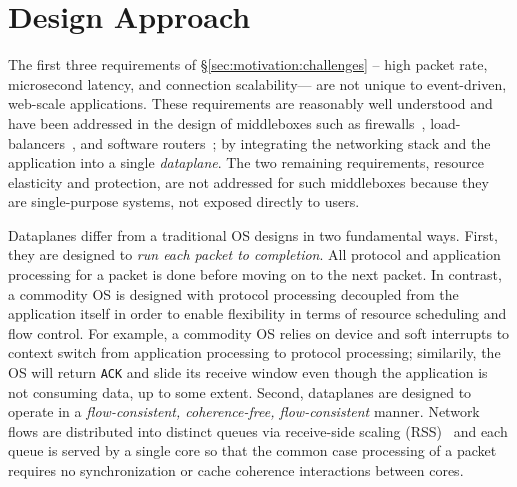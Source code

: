 \section{\ix Design Approach}
\label{sec:design}


The first three requirements of \S\ref{sec:motivation:challenges} --
high packet rate, microsecond latency, and connection scalability---
are not unique to event-driven, web-scale applications.  These
requirements are reasonably well understood and have been addressed in
the design of middleboxes such as firewalls~\cite{missing},
load-balancers~\cite{missing}, and software
routers~\cite{DBLP:journals/tocs/KohlerMCJK00,DBLP:conf/sosp/DobrescuEACFIKMR09};
by integrating the networking stack and the application into a single
\emph{dataplane}. The two remaining requirements, resource elasticity
and protection, are not addressed for such middleboxes because they
are single-purpose systems, not exposed directly to users. 


Dataplanes differ from a traditional OS designs in two fundamental
ways. First, they are designed to \emph{run each packet to
  completion}. All protocol and application processing for a packet is
done before moving on to the next packet.  In contrast, a commodity OS is designed
with protocol processing decoupled from the application itself in
order to enable flexibility in terms of resource scheduling and flow
control. For example, a commodity OS relies on device and soft interrupts to context switch from application processing to protocol processing; 
similarily, the OS will return \texttt{ACK} and
slide its receive window even though the application is not consuming
data, up to some extent. Second, dataplanes are designed to operate in
a \emph{flow-consistent, coherence-free, flow-consistent} manner.
Network flows are distributed into distinct queues via receive-side
scaling (RSS)~\cite{DBLP:journals/computer/RegnierMIIMHNCF04} and each queue
is served by a single core so that the common case processing of a
packet requires no synchronization or cache coherence interactions
between cores.

